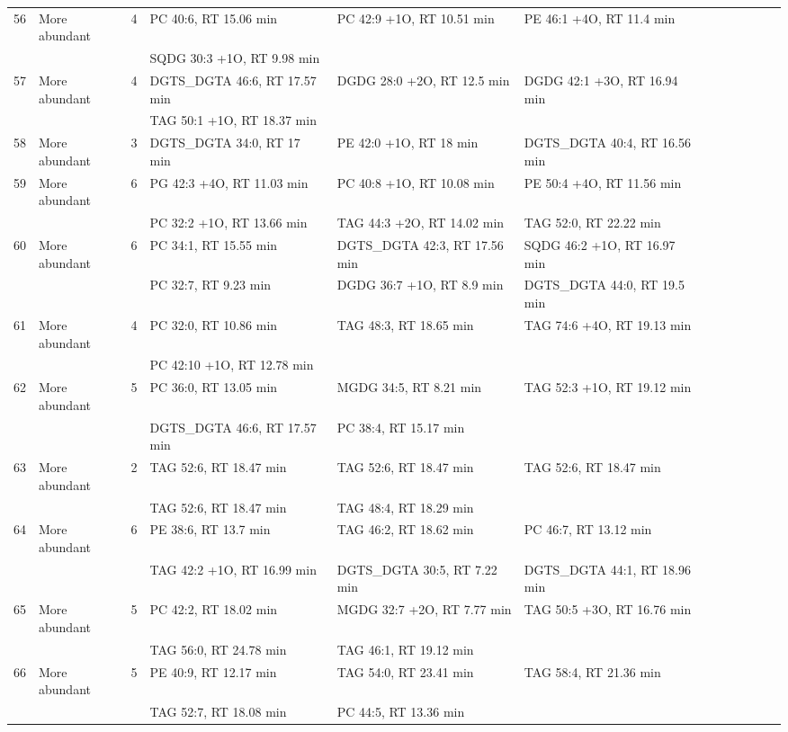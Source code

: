 \begin{landscape}
\begin{footnotesize}
\begin{singlespace}
\begin{flushleft}
\begin{longtable}{ Lp{.03\linewidth} Lp{.12\linewidth} Lp{.03\linewidth} Lp{.24\linewidth} Lp{.24\linewidth} Lp{.24\linewidth} }
56 & More abundant & 4 & PC 40:6, RT 15.06 min & PC 42:9 +1O, RT 10.51 min & PE 46:1 +4O, RT 11.4 min \\
 &  &  & SQDG 30:3 +1O, RT 9.98 min &  &  \\
57 & More abundant & 4 & DGTS\_DGTA 46:6, RT 17.57 min & DGDG 28:0 +2O, RT 12.5 min & DGDG 42:1 +3O, RT 16.94 min \\
 &  &  & TAG 50:1 +1O, RT 18.37 min &  &  \\
58 & More abundant & 3 & DGTS\_DGTA 34:0, RT 17 min & PE 42:0 +1O, RT 18 min & DGTS\_DGTA 40:4, RT 16.56 min \\
59 & More abundant & 6 & PG 42:3 +4O, RT 11.03 min & PC 40:8 +1O, RT 10.08 min & PE 50:4 +4O, RT 11.56 min \\
 &  &  & PC 32:2 +1O, RT 13.66 min & TAG 44:3 +2O, RT 14.02 min & TAG 52:0, RT 22.22 min \\
60 & More abundant & 6 & PC 34:1, RT 15.55 min & DGTS\_DGTA 42:3, RT 17.56 min & SQDG 46:2 +1O, RT 16.97 min \\
 &  &  & PC 32:7, RT 9.23 min & DGDG 36:7 +1O, RT 8.9 min & DGTS\_DGTA 44:0, RT 19.5 min \\
61 & More abundant & 4 & PC 32:0, RT 10.86 min & TAG 48:3, RT 18.65 min & TAG 74:6 +4O, RT 19.13 min \\
 &  &  & PC 42:10 +1O, RT 12.78 min &  &  \\
62 & More abundant & 5 & PC 36:0, RT 13.05 min & MGDG 34:5, RT 8.21 min & TAG 52:3 +1O, RT 19.12 min \\
 &  &  & DGTS\_DGTA 46:6, RT 17.57 min & PC 38:4, RT 15.17 min &  \\
63 & More abundant & 2 & TAG 52:6, RT 18.47 min & TAG 52:6, RT 18.47 min & TAG 52:6, RT 18.47 min \\
 &  &  & TAG 52:6, RT 18.47 min & TAG 48:4, RT 18.29 min &  \\
64 & More abundant & 6 & PE 38:6, RT 13.7 min & TAG 46:2, RT 18.62 min & PC 46:7, RT 13.12 min \\
 &  &  & TAG 42:2 +1O, RT 16.99 min & DGTS\_DGTA 30:5, RT 7.22 min & DGTS\_DGTA 44:1, RT 18.96 min \\
65 & More abundant & 5 & PC 42:2, RT 18.02 min & MGDG 32:7 +2O, RT 7.77 min & TAG 50:5 +3O, RT 16.76 min \\
 &  &  & TAG 56:0, RT 24.78 min & TAG 46:1, RT 19.12 min &  \\
66 & More abundant & 5 & PE 40:9, RT 12.17 min & TAG 54:0, RT 23.41 min & TAG 58:4, RT 21.36 min \\
 &  &  & TAG 52:7, RT 18.08 min & PC 44:5, RT 13.36 min &  \\

\end{longtable}
\end{flushleft}
\end{singlespace}
\end{footnotesize}
\end{landscape}
